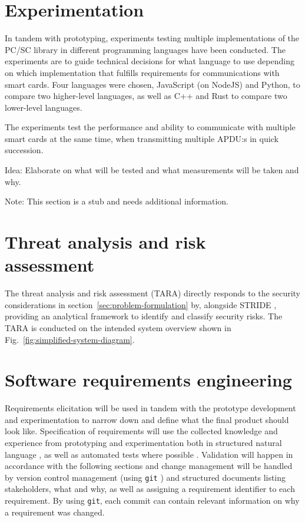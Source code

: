 \section{Experimentation}
\label{sec:experimentation}

In tandem with prototyping, experiments testing multiple
implementations of the PC/SC \cite{pcsc} library in different
programming languages have been conducted. The experiments are
to guide technical decisions for what language to use depending on
which implementation that fulfills requirements for communications
with smart cards. Four languages were chosen, JavaScript (on
NodeJS) and Python, to compare two higher-level languages, as well
as C++ and Rust to compare two lower-level languages.

The experiments test the performance and ability to communicate with
multiple smart cards at the same time, when transmitting multiple
APDU:s in quick succession.

Idea: Elaborate on what will be tested and what measurements will
be taken and why.

Note: This section is a stub and needs additional information.

\section{Threat analysis and risk assessment}
\label{sec:tara}

The threat analysis and risk assessment (TARA) \cite{tara} directly
responds to the security considerations in section~\ref{sec:problem-formulation}
by, alongside STRIDE \cite{stride}, providing an analytical
framework to identify and classify security risks. The TARA is
conducted on the intended system overview shown in Fig.~\ref{fig:simplified-system-diagram}.

\section{Software requirements engineering}
\label{sec:software-requirements-engineering}

Requirements elicitation will be used in tandem with the prototype
development and experimentation to narrow down and define what the
final product should look like. Specification of requirements will
use the collected knowledge and experience from prototyping and
experimentation both in structured natural language \cite[121]{sommerville-software-engineering},
as well as automated tests where possible \cite{test-cases-as-requirements}.
Validation will happen in accordance with the following sections
and change management will be handled by version control management
(using \verb|git| \cite{git}) and structured documents listing
stakeholders, what and why, as well as assigning a requirement
identifier to each requirement. By using \verb|git|, each commit
can contain relevant information on why a requirement was changed.

